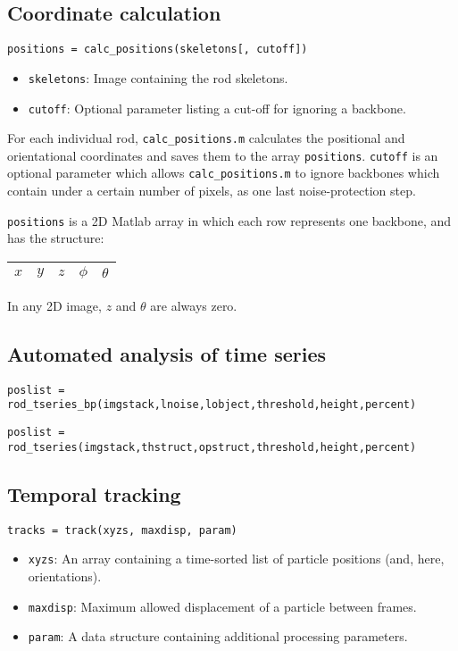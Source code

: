 \subsection{Coordinate calculation}

\texttt{positions = calc\_positions(skeletons[, cutoff])}

\begin{itemize}
\item \texttt{skeletons}: Image containing the rod skeletons.
\item \texttt{cutoff}: Optional parameter listing a cut-off for ignoring a backbone.
\end{itemize}

For each individual rod, \texttt{calc\_positions.m} calculates the positional and
orientational coordinates and saves them to the array \texttt{positions}.  
\texttt{cutoff} is an optional parameter which allows \texttt{calc\_positions.m} to 
ignore backbones which contain under a certain number of pixels, as one last noise-protection step.

\texttt{positions} is a 2D Matlab array in which each row represents one backbone, and has 
the structure:

\begin{tabular}{ | c | c | c | c | c | }
\hline 
$x$ & $y$ & $z$ & $\phi$ & $\theta$ \\
\hline
\end{tabular}

In any 2D image, $z$ and $\theta$ are always zero.

\subsection{Automated analysis of time series}

\texttt{poslist = rod\_tseries\_bp(imgstack,lnoise,lobject,threshold,height,percent)}

\texttt{poslist = rod\_tseries(imgstack,thstruct,opstruct,threshold,height,percent)}

\subsection{Temporal tracking}

\texttt{tracks = track(xyzs, maxdisp, param)}

\begin{itemize}
\item \texttt{xyzs}: An array containing a time-sorted list of particle positions (and, here, orientations).
\item \texttt{maxdisp}: Maximum allowed displacement of a particle between frames.
\item \texttt{param}: A data structure containing additional processing parameters.
\end{itemize}

